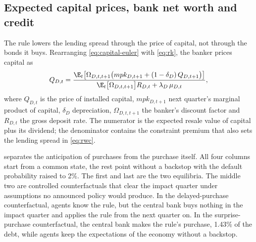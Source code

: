 \subsection{Expected capital prices, bank net worth and credit}
\label{sec:res-mechanism}

The rule lowers the lending spread through the price of capital, not through the bonds it buys.
Rearranging \eqref{eq:capital-euler} with \eqref{eq:rk}, the banker prices capital as
\begin{equation}
Q_{D,t}=\frac{\E_t\bigl[\Omega_{D,t,t+1}\bigl(mpk_{D,t+1}+(1-\delta_D)\,Q_{D,t+1}\bigr)\bigr]}
             {\E_t\bigl[\Omega_{D,t,t+1}\bigr]R_{D,t}+\lambda_D\,\mu_{D,t}},
\label{eq:capital-price}
\end{equation}
where $Q_{D,t}$ is the price of installed capital, $mpk_{D,t+1}$ next quarter's marginal product
of capital, $\delta_D$ depreciation, $\Omega_{D,t,t+1}$ the banker's discount factor and $R_{D,t}$
the gross deposit rate. The numerator is the expected resale value of capital plus its dividend;
the denominator contains the constraint premium that also sets the lending spread in
\eqref{eq:rwc}.

 separates the anticipation of purchases from the purchase itself. All four
columns start from a common state, the rest point without a backstop with the default
probability raised to 2\%. The first and last are the two equilibria. The middle two are
controlled counterfactuals that clear the impact quarter under assumptions no announced policy
would produce. In the delayed-purchase counterfactual, agents know the rule, but the central bank
buys nothing in the impact quarter and applies the rule from the next quarter on. In the
surprise-purchase counterfactual, the central bank makes the rule's purchase, 1.43\% of the
debt, while agents keep the expectations of the economy without a backstop.

